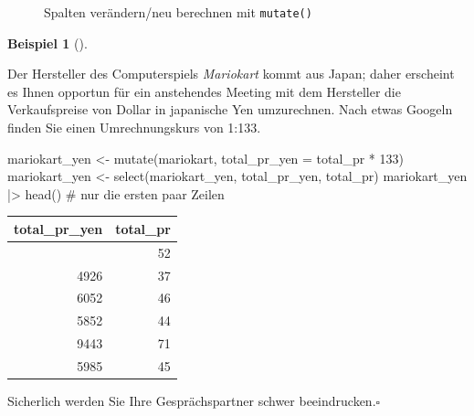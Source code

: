 \documentclass[
  letterpaper,
]{scrbook}
\newenvironment{Shaded}{\begin{snugshade}}{\end{snugshade}}
\newcommand{\AttributeTok}[1]{\textcolor[rgb]{0.40,0.45,0.13}{#1}}
\newcommand{\CommentTok}[1]{\textcolor[rgb]{0.37,0.37,0.37}{#1}}
\newcommand{\DecValTok}[1]{\textcolor[rgb]{0.68,0.00,0.00}{#1}}
\newcommand{\FunctionTok}[1]{\textcolor[rgb]{0.28,0.35,0.67}{#1}}
\newcommand{\NormalTok}[1]{\textcolor[rgb]{0.00,0.23,0.31}{#1}}
\newcommand{\OtherTok}[1]{\textcolor[rgb]{0.00,0.23,0.31}{#1}}
\newcommand{\SpecialCharTok}[1]{\textcolor[rgb]{0.37,0.37,0.37}{#1}}
\theoremstyle{definition}
\newtheorem{example}{Beispiel}[chapter]
\theoremstyle{definition}
\theoremstyle{definition}
\theoremstyle{remark}
\begin{document}
\begin{figure}


\caption{\label{fig-mutate}Spalten verändern/neu berechnen mit
\texttt{mutate()}}

\end{figure}%

\begin{example}[]\protect\hypertarget{exm-mutate}{}\label{exm-mutate}

Der Hersteller des Computerspiels \emph{Mariokart} kommt aus Japan;
daher erscheint es Ihnen opportun für ein anstehendes Meeting mit dem
Hersteller die Verkaufspreise von Dollar in japanische Yen umzurechnen.
Nach etwas Googeln finden Sie einen Umrechnungskurs von 1:133.

\begin{Shaded}
\begin{Highlighting}[]
\NormalTok{mariokart\_yen }\OtherTok{\textless{}{-}} 
  \FunctionTok{mutate}\NormalTok{(mariokart, }\AttributeTok{total\_pr\_yen =}\NormalTok{ total\_pr }\SpecialCharTok{*} \DecValTok{133}\NormalTok{)}
\NormalTok{mariokart\_yen }\OtherTok{\textless{}{-}} \FunctionTok{select}\NormalTok{(mariokart\_yen, total\_pr\_yen, total\_pr)}
\NormalTok{mariokart\_yen }\SpecialCharTok{|\textgreater{}} \FunctionTok{head}\NormalTok{()  }\CommentTok{\# nur die ersten paar Zeilen}
\end{Highlighting}
\end{Shaded}

\begin{longtable}[]{@{}rr@{}}
\toprule\noalign{}
total\_pr\_yen & total\_pr \\
\midrule\noalign{}
\endhead
\bottomrule\noalign{}
\endlastfoot
6856 & 52 \\
4926 & 37 \\
6052 & 46 \\
5852 & 44 \\
9443 & 71 \\
5985 & 45 \\
\end{longtable}

Sicherlich werden Sie Ihre Gesprächspartner schwer
beeindrucken.\(\square\)

\end{example}
\end{document}
